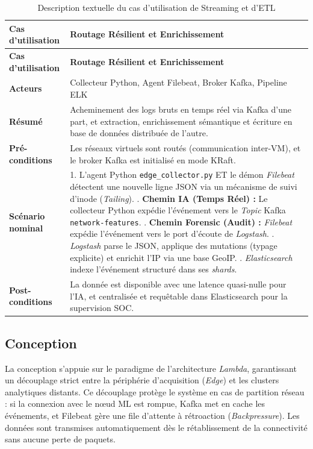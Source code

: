 \begin{center}
\renewcommand{\arraystretch}{1.5}
\begin{longtable}{|p{}|p{}|}
\caption{Description textuelle du cas d'utilisation de Streaming et d'ETL}
\label{tab:usecase_etl} \\
\hline
\rowcolor[HTML]{EFEFEF}
\textbf{Cas d'utilisation} & \textbf{Routage Résilient et Enrichissement} \\ \hline
\endfirsthead

\hline
\rowcolor[HTML]{EFEFEF}
\textbf{Cas d'utilisation} & \textbf{Routage Résilient et Enrichissement} \\ \hline
\endhead

\textbf{Acteurs} & Collecteur Python, Agent Filebeat, Broker Kafka, Pipeline ELK \\ \hline
\textbf{Résumé} & Acheminement des logs bruts en temps réel via Kafka d'une part, et extraction, enrichissement sémantique et écriture en base de données distribuée de l'autre. \\ \hline
\textbf{Pré-conditions} & Les réseaux virtuels sont routés (communication inter-VM), et le broker Kafka est initialisé en mode KRaft. \\ \hline
\textbf{Scénario nominal} &
1. L'agent Python \texttt{edge\_collector.py} ET le démon \textit{Filebeat} détectent une nouvelle ligne JSON via un mécanisme de suivi d'inode (\textit{Tailing}). \newline
2. \textbf{Chemin IA (Temps Réel) :} Le collecteur Python expédie l'événement vers le \textit{Topic} Kafka \texttt{network-features}. \newline
3. \textbf{Chemin Forensic (Audit) :} \textit{Filebeat} expédie l'événement vers le port d'écoute de \textit{Logstash}. \newline
4. \textit{Logstash} parse le JSON, applique des mutations (typage explicite) et enrichit l'IP via une base GeoIP. \newline
5. \textit{Elasticsearch} indexe l'événement structuré dans ses \textit{shards}. \\ \hline
\textbf{Post-conditions} & La donnée est disponible avec une latence quasi-nulle pour l'IA, et centralisée et requêtable dans Elasticsearch pour la supervision SOC. \\ \hline
\end{longtable}
\end{center}

\subsection{Conception}
La conception s'appuie sur le paradigme de l'architecture \textit{Lambda}, garantissant un découplage strict entre la périphérie d'acquisition (\textit{Edge}) et les clusters analytiques distants. Ce découplage protège le système en cas de partition réseau : si la connexion avec le nœud ML est rompue, Kafka met en cache les événements, et Filebeat gère une file d'attente à rétroaction (\textit{Backpressure}). Les données sont transmises automatiquement dès le rétablissement de la connectivité sans aucune perte de paquets.

